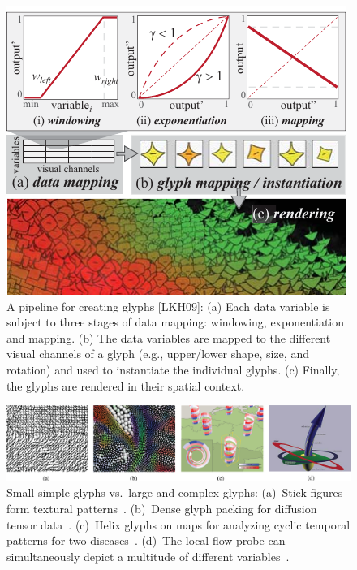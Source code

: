 \begin{figure}[!th]
  \centering
  \includegraphics{images/related-work-glyphs/glyph-pipeline.pdf}
  \caption{A pipeline for creating glyphs [LKH09]: (a) Each data variable is subject to three stages of data mapping:
windowing, exponentiation and mapping.
(b) The data variables are mapped to the different visual channels of a glyph (e.g., upper/lower shape, size, and rotation) and used to instantiate the individual glyphs. (c) Finally, the glyphs are rendered in their spatial context.\label{fig:pipeline}}

\end{figure}
\begin{figure}[!t]
  \centering
  \includegraphics[width=\textwidth]{images/related-work-glyphs/sparse-vs-dense.png}
  \caption{Small simple glyphs vs.\ large and complex glyphs: 
  (a)~Stick figures form textural patterns~\cite{pickettGrinstein88iconic}. 
  (b)~Dense glyph packing for diffusion tensor data~\cite{kindlmannWestin06glyphPacking}. 
  (c)~Helix glyphs on maps for analyzing cyclic temporal patterns for two diseases~\cite{tominski05helix}.
  (d)~The local flow probe can simultaneously depict a multitude of different variables~\cite{deLeeuwVanWijk93probe}.}
\label{fig:sparseVsDense}
\end{figure}

